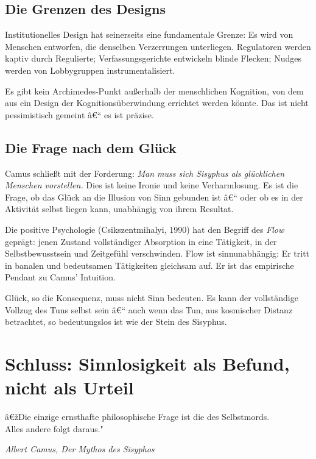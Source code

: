 ﻿\documentclass[12pt, a4paper]{article}
\begin{document}
\subsection{Die Grenzen des Designs}

Institutionelles Design hat seinerseits eine fundamentale Grenze: Es wird
von Menschen entworfen, die denselben Verzerrungen unterliegen. Regulatoren
werden kaptiv durch Regulierte; Verfassungsgerichte entwickeln blinde
Flecken; Nudges werden von Lobbygruppen instrumentalisiert.

Es gibt kein Archimedes-Punkt außerhalb der menschlichen Kognition,
von dem aus ein Design der Kognitionsüberwindung errichtet werden könnte.
Das ist nicht pessimistisch gemeint â€“ es ist präzise.

\subsection{Die Frage nach dem Glück}

Camus schließt mit der Forderung: \textit{Man muss sich Sisyphus als
glücklichen Menschen vorstellen.} Dies ist keine Ironie und keine Verharmlosung.
Es ist die Frage, ob das Glück an die Illusion von Sinn gebunden ist â€“
oder ob es in der Aktivität selbst liegen kann, unabhängig von ihrem Resultat.

Die positive Psychologie (Csikszentmihalyi, 1990) hat den Begriff des
\emph{Flow} geprägt: jenen Zustand vollständiger Absorption in eine Tätigkeit,
in der Selbstbewusstsein und Zeitgefühl verschwinden. Flow ist sinnunabhängig:
Er tritt in banalen und bedeutsamen Tätigkeiten gleichsam auf. Er ist das
empirische Pendant zu Camus' Intuition.

Glück, so die Konsequenz, muss nicht Sinn bedeuten. Es kann der vollständige
Vollzug des Tuns selbst sein â€“ auch wenn das Tun, aus kosmischer Distanz
betrachtet, so bedeutungslos ist wie der Stein des Sisyphus.

\section{Schluss: Sinnlosigkeit als Befund, nicht als Urteil}

\epigraph{â€žDie einzige ernsthafte philosophische Frage ist die des Selbstmords.\\
Alles andere folgt daraus."}{\textit{Albert Camus, Der Mythos des Sisyphos}}
\end{document}
